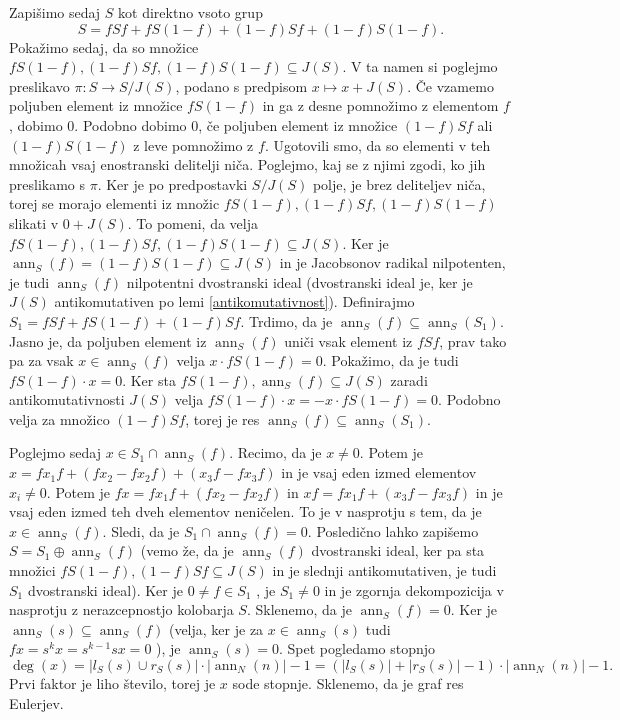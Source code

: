 \documentclass[a4paper, 12pt]{amsart}
\theoremstyle{definition} %
\theoremstyle{plain} %
\DeclareMathOperator{\ann}{ann}
\begin{document}
Zapišimo sedaj $S$ kot direktno vsoto grup
$$
S = fSf + fS(1-f) + (1-f)Sf + (1-f)S(1-f).
$$
Pokažimo sedaj, da so množice  $fS(1-f), (1-f)Sf, (1-f)S(1-f) \subseteq J(S)$. V ta namen si poglejmo preslikavo $\pi : S \rightarrow S/J(S)$, podano s predpisom $x\mapsto x+J(S)$. Če vzamemo poljuben element iz množice $fS(1-f)$ in ga z desne pomnožimo z elementom $f$, dobimo 0. Podobno dobimo 0, če poljuben element iz množice $(1-f)Sf$ ali $(1-f)S(1-f)$ z leve pomnožimo z $f$. Ugotovili smo, da so elementi v teh množicah vsaj enostranski delitelji niča. Poglejmo, kaj se z njimi zgodi, ko jih preslikamo s $\pi$. Ker je po predpostavki $S/J(S)$ polje, je brez deliteljev niča, torej se morajo elementi iz množic $fS(1-f), (1-f)Sf, (1-f)S(1-f)$ slikati v $0+J(S)$. To pomeni, da velja $fS(1-f), (1-f)Sf, (1-f)S(1-f) \subseteq J(S)$. Ker je $\ann_S(f) = (1-f)S(1-f) \subseteq J(S)$ in je Jacobsonov radikal nilpotenten, je tudi $\ann_S(f)$ nilpotentni dvostranski ideal (dvostranski ideal je, ker je $J(S)$ antikomutativen po lemi \ref{antikomutativnost}). Definirajmo $S_1 = fSf + fS(1-f) + (1-f)Sf$. Trdimo, da je $\ann_S(f) \subseteq \ann_S(S_1)$. Jasno je, da poljuben element iz $\ann_S(f)$ uniči vsak element iz $fSf$, prav tako pa za vsak $x\in \ann_S(f)$ velja $x\cdot fS(1-f) = 0$. Pokažimo, da je tudi $fS(1-f) \cdot x = 0$. Ker sta $fS(1-f), \ann_S(f)\subseteq J(S)$ zaradi antikomutativnosti $J(S)$ velja $fS(1-f) \cdot x = - x\cdot fS(1-f) = 0$. Podobno velja za množico $(1-f)Sf$, torej je res $\ann_S(f) \subseteq \ann_S(S_1)$. 

Poglejmo sedaj $x\in S_1 \cap \ann_S(f) $. Recimo, da je $x\neq0 $. Potem je $x = fx_1 f + (fx_2 - fx_2 f) + (x_3 f - fx_3 f)$ in je vsaj eden izmed elementov $x_i \neq 0$. Potem je $fx = fx_1 f + (fx_2 - fx_2 f ) $ in $xf = fx_1f + (x_3f - fx_3f)$ in je vsaj eden izmed teh dveh elementov neničelen. To  je v nasprotju s tem, da je $x\in \ann_S(f)$. Sledi, da je $S_1 \cap \ann_S(f) = 0$. Posledično lahko zapišemo $S = S_1 \oplus \ann_S(f)$ (vemo že, da je $\ann_S(f)$ dvostranski ideal, ker pa sta množici $fS(1-f),(1-f)Sf \subseteq J(S) $ in je slednji antikomutativen, je tudi $S_1$ dvostranski ideal). Ker je $0\neq f\in S_1$ , je $S_1\neq 0$ in je zgornja dekompozicija v nasprotju z nerazcepnostjo kolobarja $S$. Sklenemo, da je $\ann_S(f) = 0$. Ker je $\ann_S(s) \subseteq \ann_S(f)$ (velja, ker je za $x\in \ann_S(s)$ tudi $fx = s^k x = s^{k-1 } sx = 0$ ), je $\ann_S(s) = 0$. Spet pogledamo stopnjo
$$
\deg(x) = |l_S(s) \cup r_S(s)|\cdot |\ann_N(n)|-1 = (|l_S(s) | + |r_S(s)|-1)\cdot |\ann_N(n)| - 1.
$$
Prvi faktor je liho število, torej je $x$ sode stopnje. Sklenemo, da je graf res Eulerjev.
\end{document}
